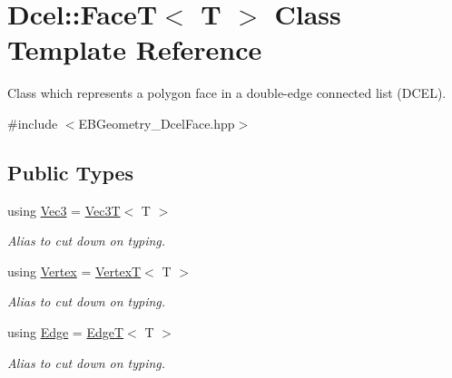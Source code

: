 \hypertarget{classDcel_1_1FaceT}{}\section{Dcel\+:\+:FaceT$<$ T $>$ Class Template Reference}
\label{classDcel_1_1FaceT}


Class which represents a polygon face in a double-\/edge connected list (D\+C\+EL).  




{\ttfamily \#include $<$E\+B\+Geometry\+\_\+\+Dcel\+Face.\+hpp$>$}

\subsection*{Public Types}
\begin{DoxyCompactItemize}
\item 
\mbox{\label{classDcel_1_1FaceT_ade9c182834ec6f18a0e17b8140308db2}} 
using \hyperlink{classDcel_1_1FaceT_ade9c182834ec6f18a0e17b8140308db2}{Vec3} = \hyperlink{classVec3T}{Vec3T}$<$ T $>$
\begin{DoxyCompactList}\small\item\em Alias to cut down on typing. \end{DoxyCompactList}\item 
\mbox{\label{classDcel_1_1FaceT_acf33f51e5402ed6bf811521b138121b9}} 
using \hyperlink{classDcel_1_1FaceT_acf33f51e5402ed6bf811521b138121b9}{Vertex} = \hyperlink{classDcel_1_1VertexT}{VertexT}$<$ T $>$
\begin{DoxyCompactList}\small\item\em Alias to cut down on typing. \end{DoxyCompactList}\item 
\mbox{\label{classDcel_1_1FaceT_a32a6b328d61bd2739fd840b892833c41}} 
using \hyperlink{classDcel_1_1FaceT_a32a6b328d61bd2739fd840b892833c41}{Edge} = \hyperlink{classDcel_1_1EdgeT}{EdgeT}$<$ T $>$
\begin{DoxyCompactList}\small\item\em Alias to cut down on typing. \end{DoxyCompactList}\item 
\mbox{\label{classDcel_1_1FaceT_a01d61241adc3c536c364084740b8c6da}} 

\end{DoxyCompactItemize}
